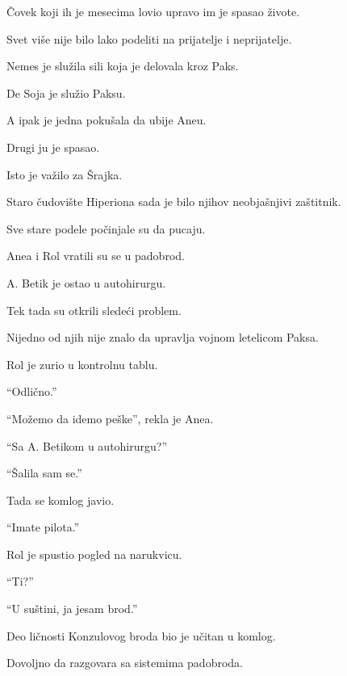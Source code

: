 \bigskip

Čovek koji ih je mesecima lovio upravo im je spasao živote.

\bigskip

Svet više nije bilo lako podeliti na prijatelje i neprijatelje.

\bigskip

Nemes je služila sili koja je delovala kroz Paks.

De Soja je služio Paksu.

A ipak je jedna pokušala da ubije Aneu.

Drugi ju je spasao.

\bigskip

Isto je važilo za Šrajka.

\bigskip

Staro čudovište Hiperiona sada je bilo njihov neobjašnjivi zaštitnik.

\bigskip

Sve stare podele počinjale su da pucaju.

\bigskip

Anea i Rol vratili su se u padobrod.

A. Betik je ostao u autohirurgu.

\bigskip

Tek tada su otkrili sledeći problem.

Nijedno od njih nije znalo da upravlja vojnom letelicom Paksa.

\bigskip

Rol je zurio u kontrolnu tablu.

``Odlično.''

\bigskip

``Možemo da idemo peške'', rekla je Anea.

``Sa A. Betikom u autohirurgu?''

``Šalila sam se.''

\bigskip

Tada se komlog javio.

``Imate pilota.''

\bigskip

Rol je spustio pogled na narukvicu.

``Ti?''

``U suštini, ja jesam brod.''

\bigskip

Deo ličnosti Konzulovog broda bio je učitan u komlog.

Dovoljno da razgovara sa sistemima padobroda.

\bigskip


